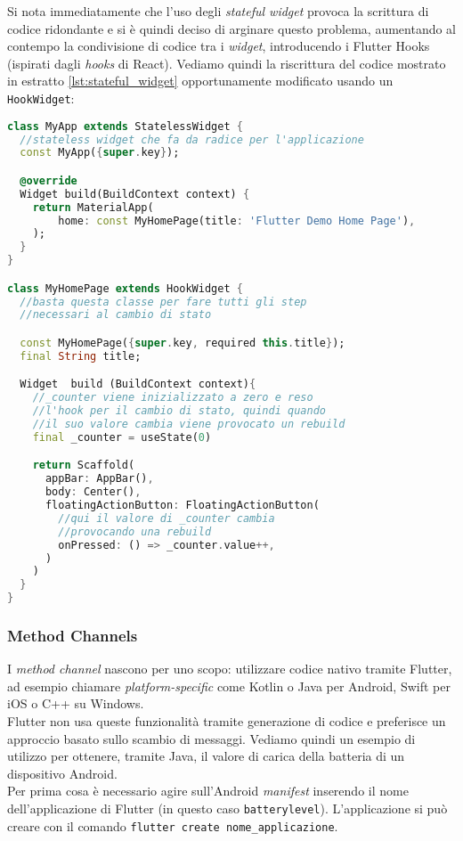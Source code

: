 Si nota immediatamente che l'uso degli \textit{stateful widget} provoca la scrittura di codice ridondante e si è quindi deciso di arginare questo problema, aumentando al contempo la condivisione di codice tra i \textit{widget}, introducendo i Flutter Hooks (ispirati dagli \textit{hooks} di React).
Vediamo quindi la riscrittura del codice mostrato in estratto \ref{lst:stateful_widget} opportunamente modificato usando un \verb+HookWidget+:

\begin{lstlisting}[language=dart, caption={Creazione \textit{hook widget}}]
class MyApp extends StatelessWidget {
  //stateless widget che fa da radice per l'applicazione
  const MyApp({super.key});

  @override
  Widget build(BuildContext context) {
    return MaterialApp(
        home: const MyHomePage(title: 'Flutter Demo Home Page'),
    );
  }
}

class MyHomePage extends HookWidget {
  //basta questa classe per fare tutti gli step
  //necessari al cambio di stato

  const MyHomePage({super.key, required this.title});
  final String title;

  Widget  build (BuildContext context){
    //_counter viene inizializzato a zero e reso
    //l'hook per il cambio di stato, quindi quando
    //il suo valore cambia viene provocato un rebuild
    final _counter = useState(0)

    return Scaffold(
      appBar: AppBar(),
      body: Center(),
      floatingActionButton: FloatingActionButton(
        //qui il valore di _counter cambia
        //provocando una rebuild
        onPressed: () => _counter.value++,
      )
    )
  }
}
\end{lstlisting}

\subsubsection{Method Channels}
I \textit{method channel} nascono per uno scopo: utilizzare codice nativo tramite Flutter, ad esempio chiamare \api{} \textit{platform-specific} come Kotlin o Java per Android, Swift per iOS o C++ su Windows.\\
Flutter non usa queste funzionalità tramite generazione di codice e preferisce un approccio basato sullo scambio di messaggi. Vediamo quindi un esempio di utilizzo per ottenere, tramite Java, il valore di carica della batteria di un dispositivo Android.\\
Per prima cosa è necessario agire sull'Android \textit{manifest} inserendo il nome dell'applicazione di Flutter (in questo caso \verb+batterylevel+). L'applicazione si può creare con il comando \verb+flutter create nome_applicazione+.

